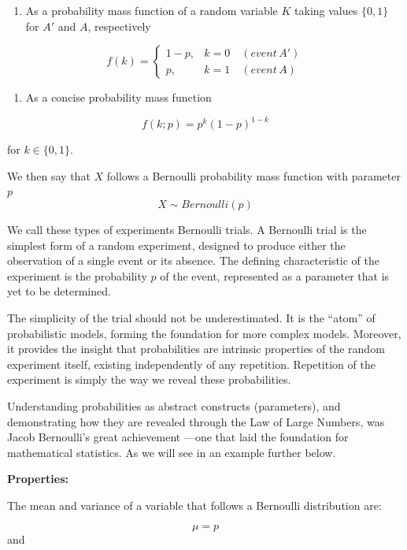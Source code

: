 \documentclass[
]{book}
\providecommand{\tightlist}{%
  \setlength{\itemsep}{0pt}\setlength{\parskip}{0pt}}
\begin{document}
\begin{enumerate}
\def\labelenumi{\arabic{enumi})}
\setcounter{enumi}{1}
\tightlist
\item
  As a probability mass function of a random variable \(K\) taking values \(\{0, 1\}\) for \(A'\) and \(A\), respectively
\end{enumerate}

\[
f(k) = 
\begin{cases}
1 - p, & k = 0 \quad (event \, A') \\
p, & k = 1 \quad (event \, A)
\end{cases}
\]

\begin{enumerate}
\def\labelenumi{\arabic{enumi})}
\setcounter{enumi}{2}
\tightlist
\item
  As a concise probability mass function
\end{enumerate}

\[
f(k; p) = p^k (1 - p)^{1 - k}
\]

for \(k \in \{0,1\}\).

We then say that \(X\) follows a Bernoulli probability mass function with parameter \(p\)
\[X \sim Bernoulli(p)\]

We call these types of experiments Bernoulli trials. A Bernoulli trial is the simplest form of a random experiment, designed to produce either the observation of a single event or its absence. The defining characteristic of the experiment is the probability
\(p\) of the event, represented as a parameter that is yet to be determined.

The simplicity of the trial should not be underestimated. It is the ``atom'' of probabilistic models, forming the foundation for more complex models. Moreover, it provides the insight that probabilities are intrinsic properties of the random experiment itself, existing independently of any repetition. Repetition of the experiment is simply the way we reveal these probabilities.

Understanding probabilities as abstract constructs (parameters), and demonstrating how they are revealed through the Law of Large Numbers, was Jacob Bernoulli's great achievement \citep{Bernoulli2006}---one that laid the foundation for mathematical statistics. As we will see in an example further below.

\textbf{Properties:}

The mean and variance of a variable that follows a Bernoulli distribution are:

\[\mu=p\]
and
\end{document}
